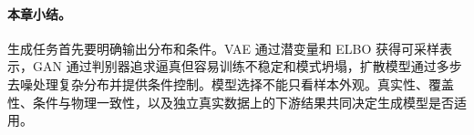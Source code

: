 \paragraph{本章小结。}
生成任务首先要明确输出分布和条件。VAE 通过潜变量和 ELBO 获得可采样表示，GAN 通过判别器追求逼真但容易训练不稳定和模式坍塌，扩散模型通过多步去噪处理复杂分布并提供条件控制。模型选择不能只看样本外观。真实性、覆盖性、条件与物理一致性，以及独立真实数据上的下游结果共同决定生成模型是否适用。